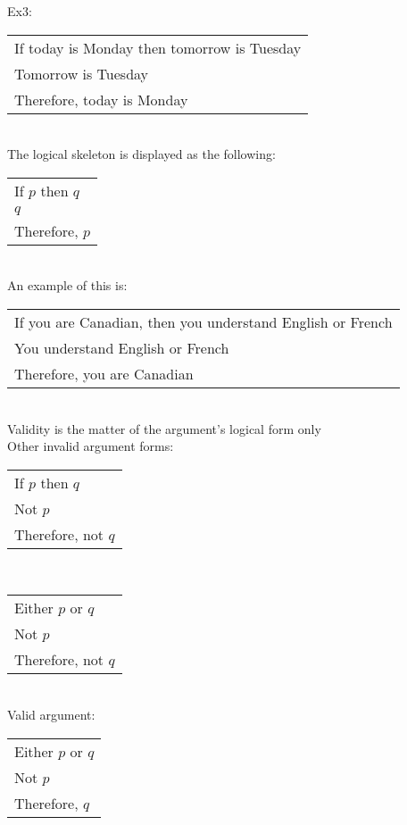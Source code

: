 Ex3:\\
\begin{tabular}{p{8cm}}
    If today is Monday then tomorrow is Tuesday\\
    Tomorrow is Tuesday\\
    \hline
    Therefore, today is Monday
\end{tabular}\\
The logical skeleton is displayed as the following:\\
\begin{tabular}{p{3cm}}
    If $p$ then $q$\\
    $q$\\
    \hline
    Therefore, $p$
\end{tabular}\\
An example of this is:\\
\begin{tabular}{p{10cm}}
    If you are Canadian, then you understand English or French\\
    You understand English or French\\
    \hline
    Therefore, you are Canadian
\end{tabular}\\

Validity is the matter of the argument's logical form only\\

Other invalid argument forms:\\
\begin{tabular}{p{3cm}}
    If $p$ then $q$\\
    Not $p$\\
    \hline
    Therefore, not $q$
\end{tabular}\\

\begin{tabular}{p{3cm}}
    Either $p$ or $q$\\
    Not $p$\\
    \hline
    Therefore, not $q$
\end{tabular}\\

Valid argument:\\
\begin{tabular}{p{3cm}}
    Either $p$ or $q$\\
    Not $p$\\
    \hline
    Therefore, $q$
\end{tabular}\\

